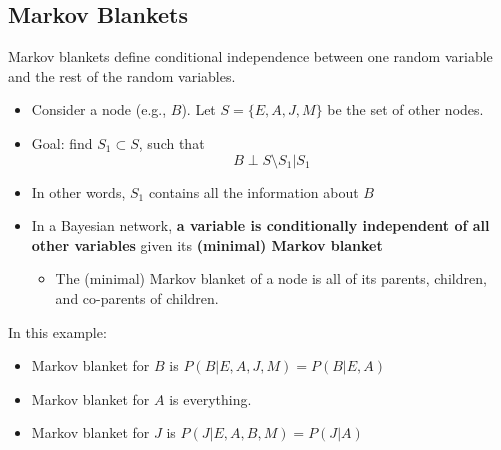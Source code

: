 \documentclass[10pt]{article}
\begin{document}
\subsection*{Markov Blankets}
Markov blankets define conditional independence between one random variable and the rest of the random variables.
\begin{center}
\end{center}
\begin{itemize}
	\item Consider a node (e.g., $B$).  Let $S = \{E, A, J, M\}$ be the set of other nodes.
	\item Goal: find $S_1 \subset S$, such that
	\[B \perp S \setminus S_1 | S_1\]
    \item In other words, $S_1$ contains all the information about $B$
    \item In a Bayesian network, \textbf{a variable is conditionally independent of all other variables} given its \textbf{(minimal) Markov blanket}
    \begin{itemize}
	    \item The (minimal) Markov blanket of a node is all of its parents, children, and co-parents of children.
    \end{itemize}
\end{itemize}
In this example:
\begin{itemize}
	\item Markov blanket for $B$ is $P(B | E, A, J, M) = P(B | E, A)$
	\item Markov blanket for $A$ is everything.
	\item Markov blanket for $J$ is $P(J | E, A, B, M) = P(J | A)$
\end{itemize}
\end{document}

